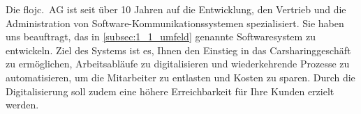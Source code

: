 Die flojc.\ AG ist seit über 10 Jahren auf die Entwicklung, den Vertrieb und die Administration von Software-Kommunikationssystemen spezialisiert.
Sie haben uns beauftragt, das in \autoref{subsec:1_1_umfeld} genannte Softwaresystem zu entwickeln.
Ziel des Systems ist es, Ihnen den Einstieg in das Carsharinggeschäft zu ermöglichen, Arbeitsabläufe zu digitalisieren und wiederkehrende Prozesse zu automatisieren, um die Mitarbeiter zu entlasten und Kosten zu sparen.
Durch die Digitalisierung soll zudem eine höhere Erreichbarkeit für Ihre Kunden erzielt werden.
